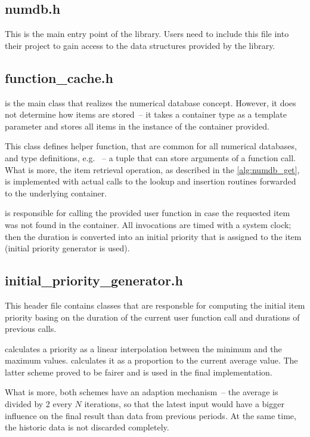 \subsection{numdb.h}
This is the main entry point of the \numdbname library. Users need to include this file into their project to gain access to the data structures provided by the library.
\subsection{function\_cache.h}
 is the main class that realizes the numerical database concept. However, it does not determine how items are stored~-- it takes a container type as a template parameter and stores all items in the instance of the container provided.

This class defines helper function, that are common for all numerical databases, and type definitions, e.g. ~-- a tuple that can store arguments of a function call. What is more, the item retrieval operation, as described in the \cref{alg:numdb_get}, is implemented with actual calls to the lookup and insertion routines forwarded to the underlying container.

 is responsible for calling the provided user function in case the requested item was not found in the container. All invocations are timed with a system clock; then the duration is converted into an initial priority that is assigned to the item (initial priority generator is used).

\subsection{initial\_priority\_generator.h}
This header file contains classes that are responsble for computing the initial item priority basing on the duration of the current user function call and durations of previous calls.

 calculates a priority as a linear interpolation between the minimum and the maximum values.  calculates it as a proportion to the current average value. The latter scheme proved to be fairer and is used in the final implementation.

What is more, both schemes have an adaption mechanism~-- the average is divided by 2 every $N$ iterations, so that the latest input would have a bigger influence on the final result than data from previous periods. At the same time, the historic data is not discarded completely.

